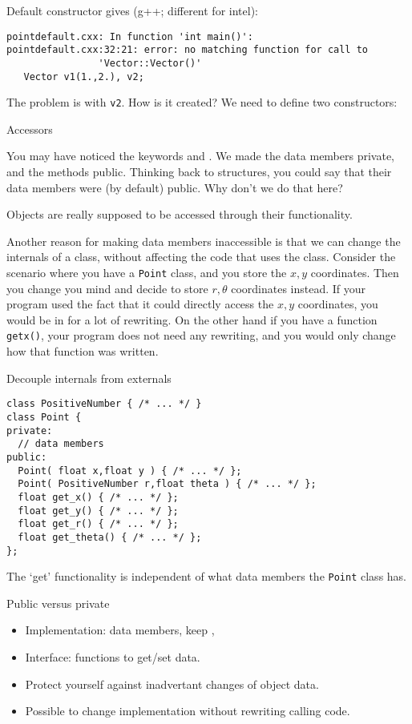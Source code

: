 \begin{slide}{Default constructor}
  \label{sl:obj-def-construct}
\small
  gives (g++; different for intel):
\begin{lstlisting}
pointdefault.cxx: In function 'int main()':
pointdefault.cxx:32:21: error: no matching function for call to
                'Vector::Vector()'
   Vector v1(1.,2.), v2;
\end{lstlisting}
The problem is with \lstinline{v2}. How is it created? We need to define two constructors:
\end{slide}

 {Accessors}

You may have noticed the keywords  and
. We made the data members private, and the
methods public. Thinking back to structures, you could say that their
data members were (by default) public. Why don't we do that here?

Objects are really supposed to be accessed through their
functionality.

Another reason for making data members inaccessible is that we can
change the internals of a class, without affecting the code that uses
the class. Consider the scenario where you have a \lstinline{Point} class, and
you store the $x,y$ coordinates. Then you change you mind and decide
to store $r,\theta$ coordinates instead. If your program used the fact
that it could directly access the $x,y$ coordinates, you would be in
for a lot of rewriting. On the other hand if you have a function
\lstinline{getx()}, your program does not need any rewriting, and you would
only change how that function was written.

\begin{block}{Decouple internals from externals}
  \label{sl:repr-independent}
\begin{lstlisting}
class PositiveNumber { /* ... */ }
class Point {
private:
  // data members
public:
  Point( float x,float y ) { /* ... */ };
  Point( PositiveNumber r,float theta ) { /* ... */ };
  float get_x() { /* ... */ };
  float get_y() { /* ... */ };
  float get_r() { /* ... */ };
  float get_theta() { /* ... */ };
};
\end{lstlisting}
  The `get' functionality is independent of what data members the
  \lstinline{Point} class has.
\end{block}

\begin{block}{Public versus private}
  \label{sl:interfaceimpl}
  \begin{itemize}
  \item Implementation: data members, keep ,
  \item Interface:  functions to get/set data.
  \item Protect yourself against inadvertant changes of object data.
  \item Possible to change implementation without rewriting calling code.
  \end{itemize}
\end{block}

